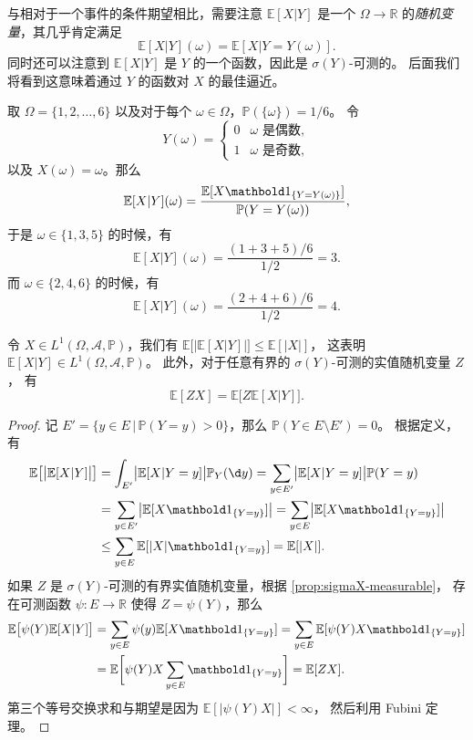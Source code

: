 与相对于一个事件的条件期望相比，需要注意 $\mathbb{E}[X|Y]$
是一个 $\Omega\to \mathbb{R}$ 的\emph{随机变量}，其几乎肯定满足
\[
  \mathbb{E}[X|Y](\omega)=\mathbb{E}[X|Y=Y(\omega)].  
\]
同时还可以注意到 $\mathbb{E}[X|Y]$ 是 $Y$ 的一个函数，因此是 $\sigma(Y)$-可测的。
后面我们将看到这意味着通过 $Y$ 的函数对 $X$ 的最佳逼近。

\begin{example}
  取 $\Omega=\{1,2,\dots,6\}$ 以及对于每个 $\omega\in \Omega$，$\mathbb{P}(\{\omega\})=1/6$。
  令
  \[
    Y(\omega)=\begin{cases}
      0 & \omega \text{ 是偶数},\\
      1 & \omega \text{ 是奇数},
    \end{cases}
  \]
  以及 $X(\omega)=\omega$。那么 
  \[
    \mathbb{E}[X|Y](\omega)=\frac{\mathbb{E}[X\idf_{\{Y=Y(\omega)\}}]}{\mathbb{P}(Y=Y(\omega))},
  \]
  于是 $\omega\in\{1,3,5\}$ 的时候，有
  \[
    \mathbb{E}[X|Y](\omega)=\frac{(1+3+5)/6}{1/2}=3.
  \]
  而 $\omega\in\{2,4,6\}$ 的时候，有
  \[
    \mathbb{E}[X|Y](\omega)=\frac{(2+4+6)/6}{1/2}=4.  
  \]
\end{example}

\begin{proposition}\label{prop:conditioning discrete basic}
  令 $X\in L^1(\Omega, \mathcal{A},\mathbb{P})$，我们有
  $\mathbb{E}\bigl[\bigl|\mathbb{E}[X|Y]\bigr|\bigr]\leq \mathbb{E}[|X|]$，
  这表明 $\mathbb{E}[X|Y]\in L^1(\Omega,\mathcal{A},\mathbb{P})$。
  此外，对于任意有界的 $\sigma(Y)$-可测的实值随机变量 $Z$，
  有
  \[
    \mathbb{E}[ZX]=\mathbb{E}\bigl[Z \mathbb{E}[X|Y]\bigr]  .
  \]
\end{proposition}
\begin{proof}
  记 $E'=\{y\in E\,|\, \mathbb{P}(Y=y)>0\}$，那么 $\mathbb{P}(Y\in E\setminus E')=0$。
  根据定义，有
  \begin{align*}
        \mathbb{E}\bigl[\bigl|\mathbb{E}[X|Y]\bigr|\bigr]
    &=\int_{E'} \bigl|\mathbb{E}[X|Y=y]\bigr| \mathbb{P}_Y(\d y)
    =\sum_{y\in E'} \bigl|\mathbb{E}[X|Y=y]\bigr| \mathbb{P}(Y=y)\\
    &=\sum_{y\in E'} \bigl|\mathbb{E}[X\idf_{\{Y=y\}}]\bigr|
    =\sum_{y\in E} \bigl|\mathbb{E}[X\idf_{\{Y=y\}}]\bigr|
    \\&\leq 
    \sum_{y\in E} \mathbb{E}[|X|\idf_{\{Y=y\}}]=\mathbb{E}[|X|].
  \end{align*}
  如果 $Z$ 是 $\sigma(Y)$-可测的有界实值随机变量，根据 \autoref{prop:sigmaX-measurable}，
  存在可测函数 $\psi:E\to \mathbb{R}$ 使得 $Z=\psi(Y)$，那么
  \begin{align*}
    \mathbb{E}\bigl[\psi(Y)\mathbb{E}[X|Y]\bigr]&=\sum_{y\in E}
    \psi(y)\mathbb{E}[X\idf_{\{Y=y\}}]=\sum_{y\in E} \mathbb{E}[\psi(Y)X\idf_{\{Y=y\}}]\\
    &=\mathbb{E}\biggl[
      \psi(Y) X \sum_{y\in E}\indicator{\{Y=y\}}
    \biggr]=\mathbb{E}[ZX].
  \end{align*}
  第三个等号交换求和与期望是因为 $\mathbb{E}[|\psi(Y)X|]<\infty$，
  然后利用 Fubini 定理。
\end{proof}

